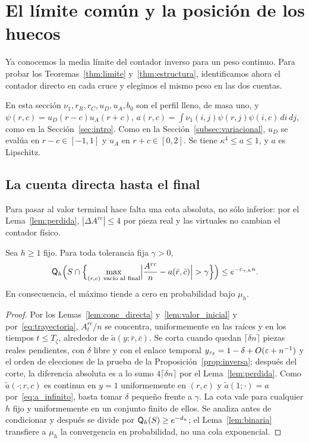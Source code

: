 \section{El límite común y la posición de los huecos}\label{sec:limite}

Ya conocemos la media límite del contador inverso para un peso continuo. Para
probar los Teoremas~\ref{thm:limite} y~\ref{thm:estructura}, identificamos ahora
el contador directo en cada cruce y elegimos el mismo peso en las dos cuentas.

En esta sección $\nu_1,r_R,r_C,u_D,u_A,b_0$ son el perfil lleno, de masa uno, y
$\psi(r,c)=u_D(r-c)u_A(r+c)$, $a(r,c)=\int\nu_1(i,j)\psi(r,j)\psi(i,c)\,di\,dj$, como en la
Sección~\ref{sec:intro}. Como en la
Sección~\ref{subsec:variacional}, $u_D$ se evalúa en $r-c\in[-1,1]$ y $u_A$ en $r+c\in[0,2]$. Se tiene
$\kappa^4\le a\le1$, y $a$ es Lipschitz.

\subsection{La cuenta directa hasta el final}

Para pasar al valor terminal hace falta una cota absoluta, no sólo inferior: por el
Lema~\ref{lem:perdida}, $|\Delta A^{rc}|\le4$ por pieza real y las virtuales no cambian el
contador físico.

\begin{proposicion}\label{prop:directa}
Sea $h\ge1$ fijo. Para toda tolerancia fija $\gamma>0$,
\[
 \QQ_h\Bigl(S\cap\Bigl\{\max_{(r,c)\ \text{vacío al final}}
 \Bigl|\frac{A^{rc}}n-a(\bar r,\bar c)\Bigr|>\gamma\Bigr\}\Bigr)\le e^{-c_{\gamma,h}n}.
\]
En consecuencia, el máximo tiende a cero en probabilidad bajo $\mu_h$.
\end{proposicion}

\begin{proof}
Por los Lemas~\ref{lem:conc_directa} y~\ref{lem:valor_inicial} y por~\eqref{eq:trayectoria},
$A^{rc}_t/n$ se concentra, uniformemente en las raíces y en los tiempos $t\le T_\zeta$, alrededor de
$\tilde a(y;\bar r,\bar c)$. Se corta cuando quedan $\lceil\delta n\rceil$ piezas reales
pendientes, con $\delta$ libre y con el enlace temporal $y_{\tau_\delta}=1-\delta+O(\varepsilon+n^{-1})$
y el orden de elecciones de la prueba de la Proposición~\ref{prop:inversa}; después del corte, la
diferencia absoluta es a lo sumo $4\lceil\delta n\rceil$ por el Lema~\ref{lem:perdida}. Como
$\tilde a(\cdot;r,c)$ es continua en $y=1$ uniformemente en $(r,c)$ y
$\tilde a(1;\cdot)=a$ por~\eqref{eq:a_infinito}, basta tomar $\delta$ pequeño frente a $\gamma$.
La cota vale para cualquier $h$ fijo y uniformemente en un conjunto finito de ellos. Se analiza
antes de condicionar y después se divide por $\mathsf{Q}_h(S)\ge e^{-d_n}$; el
Lema~\ref{lem:binaria} transfiere a $\mu_h$ la convergencia en probabilidad, no una cola
exponencial.
\end{proof}


